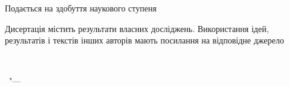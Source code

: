 \vspace{0pt plus2fill} %
\noindent
Подається на здобуття наукового ступеня
\emph{\thesisDegree}

\vspace{0pt plus4fill} %
\noindent
Дисертація містить результати власних досліджень. Використання ідей, результатів і текстів інших авторів мають посилання на відповідне джерело

\noindent \underline{\hspace{3cm}}\,\thesisAuthorShort

%
\vspace{0pt plus4fill} %
%
\vspace{0pt plus4fill} %
\begin{center}%
{\thesisCity\ "--- \thesisYear}
\end{center}%
\newpage
